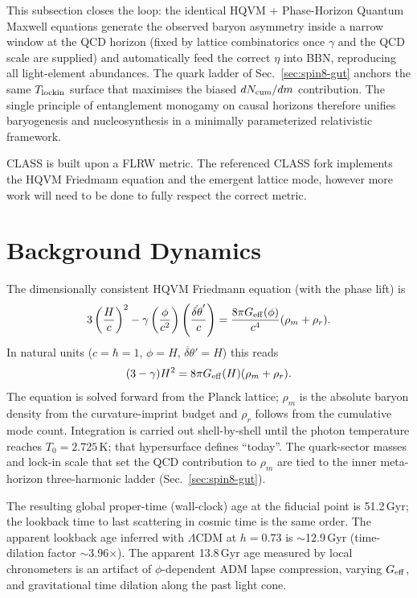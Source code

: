 \documentclass[12pt,a4paper]{article}
\begin{document}
This subsection closes the loop: the identical HQVM + Phase-Horizon Quantum Maxwell equations generate the observed baryon asymmetry inside a narrow window at the QCD horizon (fixed by lattice combinatorics once $\gamma$ and the QCD scale are supplied) and automatically feed the correct \(\eta\) into BBN, reproducing all light-element abundances.
The quark ladder of Sec.~\ref{sec:spin8-gut} anchors the same \(T_{\rm lockin}\) surface that maximises the biased \(dN_{\rm cum}/dm\) contribution.
The single principle of entanglement monogamy on causal horizons therefore unifies baryogenesis and nucleosynthesis in a minimally parameterized relativistic framework.

CLASS is built upon a FLRW metric. The referenced CLASS fork implements the HQVM Friedmann equation and the emergent lattice mode, however more work will need to be done to fully respect the correct metric.

\section{Background Dynamics}
\label{sec:background}
The dimensionally consistent HQVM Friedmann equation (with the phase lift) is
\[
3\left(\frac{H}{c}\right)^2 - \gamma \left( \frac{\phi}{c^2} \right) \left( \frac{\dot{\delta\theta}'}{c} \right) = \frac{8\pi G_{\rm eff}(\phi)}{c^4}(\rho_m + \rho_r).
\]
In natural units (\(c = \hbar = 1\), \(\phi = H\), \(\dot{\delta\theta}' = H\)) this reads
\[
(3 - \gamma) H^2 = 8\pi G_{\rm eff}(H) (\rho_m + \rho_r).
\]
The equation is solved forward from the Planck lattice; \(\rho_m\) is the absolute baryon density from the curvature-imprint budget and \(\rho_r\) follows from the cumulative mode count. Integration is carried out shell-by-shell until the photon temperature reaches \(T_0 = 2.725\,\text{K}\); that hypersurface defines ``today''.
The quark-sector masses and lock-in scale that set the QCD contribution to \(\rho_m\) are tied to the inner meta-horizon three-harmonic ladder (Sec.~\ref{sec:spin8-gut}).

The resulting global proper-time (wall-clock) age at the fiducial point is 51.2\,Gyr; the lookback time to last scattering in cosmic time is the same order. The apparent lookback age inferred with $\Lambda$CDM at $h=0.73$ is $\sim$12.9\,Gyr (time-dilation factor $\sim$3.96$\times$). The apparent 13.8\,Gyr age measured by local chronometers is an artifact of $\phi$-dependent ADM lapse compression, varying $G_{\rm eff}$, and gravitational time dilation along the past light cone.
\end{document}
